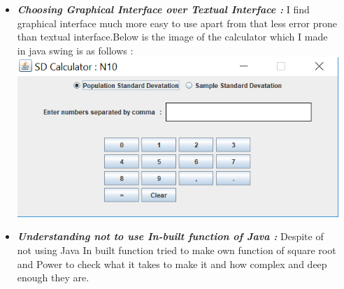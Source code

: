 \documentclass[final]{beamer}
\newlength{\onecolwid}
\newlength{\twocolwid}
\begin{document}
\begin{frame}[t]
\begin{columns}[t]
\begin{column}{\twocolwid}
\begin{columns}[t,totalwidth=\twocolwid]
\begin{column}{\onecolwid}
\begin{block}

\begin{itemize}
\item  \textit{\textbf{Choosing Graphical Interface over Textual Interface :}} I find graphical interface much more easy to use apart from that less error prone than textual interface.Below is the image of the calculator which I made in  java swing is as follows :
\includegraphics[scale=2.85]{Cal.PNG}\newline
\item  \textit{\textbf{Understanding not to use In-built function of Java : }} Despite of not using Java In built function tried to make own function of square root and Power to check what it takes to make it and how complex and deep enough they are.  
\end{itemize}

\end{block}


\end{column} %

\begin{column}{\onecolwid}\vspace{-.6in} %



\end{column}
\end{columns}
\end{column}
\end{columns}
\end{frame}
\end{document}
